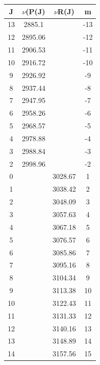 \documentclass[14pt]{extarticle}
\begin{document}
\begin{table}
\begin{minipage}[t]{0.5\textwidth}

\centering
\begin{tabular}{|c|c|c|c|}
\hline
J & $\nu$(P(J) & $\nu$R(J) & m \\
\hline
13& 2885.1 & & -13 \\
12& 2895.06 & & -12 \\
11& 2906.53 & & -11 \\
10& 2916.72 & & -10 \\
9& 2926.92 & & -9 \\
8& 2937.44 & & -8 \\
7& 2947.95 & & -7 \\
6& 2958.26 & & -6 \\
5& 2968.57 & & -5 \\
4& 2978.88 & & -4 \\
3& 2988.84 & & -3 \\
2& 2998.96 & & -2 \\
0& & 3028.67 & 1 \\
1& & 3038.42 & 2 \\
2& & 3048.09 & 3 \\
3& & 3057.63 & 4 \\
4& & 3067.18 & 5 \\
5& & 3076.57 & 6 \\
6& & 3085.86 & 7 \\
7& & 3095.16 & 8 \\
8& & 3104.34 & 9 \\
9& & 3113.38 & 10 \\
10& & 3122.43 & 11 \\
11& & 3131.33 & 12 \\
12& & 3140.16 & 13 \\
13& & 3148.89 & 14 \\
14& & 3157.56 & 15 \\
\hline
\end{tabular}

\end{minipage}%
\begin{minipage}[t]{0.5\textwidth}


\end{minipage}
\end{table}
\end{document}
